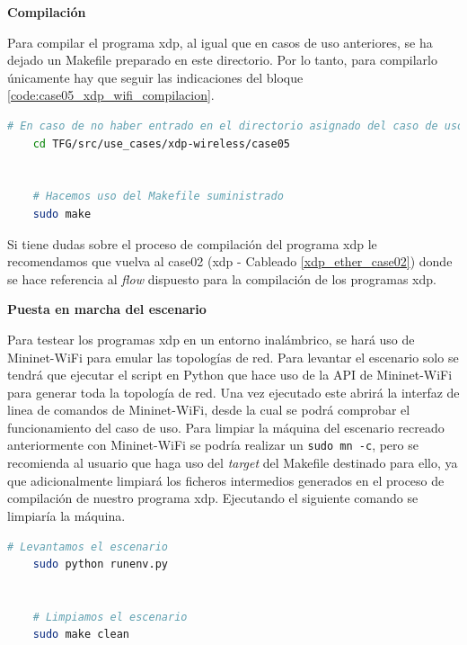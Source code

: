 \vspace{0.5cm}
\textbf{Compilación}\\
\par

Para compilar el programa \gls{xdp}, al igual que en casos de uso anteriores, se ha dejado un Makefile preparado en este directorio. Por lo tanto, para compilarlo únicamente hay que seguir las indicaciones del bloque \ref{code:case05_xdp_wifi_compilacion}.

\begin{lstlisting}[language= bash, style=Consola, caption={Compilación programa XDP - Case05},label=code:case05_xdp_wifi_compilacion]
    # En caso de no haber entrado en el directorio asignado del caso de uso
    cd TFG/src/use_cases/xdp-wireless/case05
    
    
    # Hacemos uso del Makefile suministrado 
    sudo make
\end{lstlisting}
\vspace{0.5cm}

Si tiene dudas sobre el proceso de compilación del programa \gls{xdp} le recomendamos que vuelva al case02 (\gls{xdp} - Cableado \ref{xdp_ether_case02}) donde se hace referencia al \textit{flow} dispuesto para la compilación de los programas \gls{xdp}.\\
\par



\vspace{0.5cm}
\textbf{Puesta en marcha del escenario}\\
\par

Para testear los programas \gls{xdp} en un entorno inalámbrico, se hará uso de Mininet-WiFi para emular las topologías de red. Para levantar el escenario solo se tendrá que ejecutar el script en Python que hace uso de la API de Mininet-WiFi para generar toda la topología de red. Una vez ejecutado este abrirá la interfaz de linea de comandos de Mininet-WiFi, desde la cual se podrá comprobar el funcionamiento del caso de uso. Para limpiar la máquina del escenario recreado anteriormente con Mininet-WiFi se podría realizar un \texttt{sudo mn -c}, pero se  recomienda al usuario que haga uso del \textit{target} del Makefile destinado para ello, ya que adicionalmente limpiará los ficheros intermedios generados en el proceso de compilación de nuestro programa \gls{xdp}. Ejecutando el siguiente comando se limpiaría la máquina.

\begin{lstlisting}[language= bash, style=Consola, caption={Compilación programa XDP - Case05},label=code:case05_xdp_wifi_run]
    # Levantamos el escenario
    sudo python runenv.py
    
    
    # Limpiamos el escenario
    sudo make clean
\end{lstlisting}


